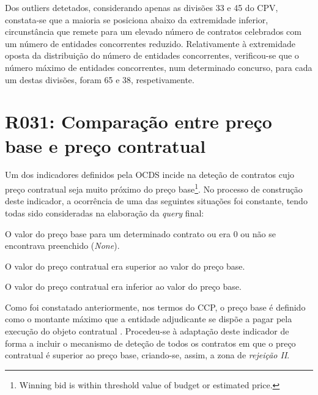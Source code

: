 Dos outliers detetados, considerando apenas as divisões 33 e 45 do CPV, constata-se que a maioria se posiciona abaixo da extremidade inferior, circunstância que remete para um elevado número de contratos celebrados com um número de entidades concorrentes reduzido. Relativamente à extremidade oposta da distribuição do número de entidades concorrentes, verificou-se que o número máximo de entidades concorrentes, num determinado concurso, para cada um destas divisões, foram 65 e 38, respetivamente.



\section{R031: Comparação entre preço base e preço contratual}

Um dos indicadores definidos pela OCDS incide na deteção de contratos cujo preço contratual seja muito próximo do preço base\footnote{Winning bid is within threshold value of budget or estimated price.}. No processo de construção deste indicador, a ocorrência de uma das seguintes situações foi constante, tendo todas sido consideradas na elaboração da \textit{query} final:

\begin{my_enumerate}
	
	\item O valor do preço base para um determinado contrato ou era 0 ou não se encontrava preenchido (\textit{None}). \label{ponto1}
	
	\item O valor do preço contratual era superior ao valor do preço base. \label{ponto2}
	
	\item O valor do preço contratual era inferior ao valor do preço base.
	
\end{my_enumerate}

Como foi constatado anteriormente, nos termos do CCP, o preço base é definido como o montante máximo que a entidade adjudicante se dispõe a pagar pela execução do objeto contratual \cite{precobase}. Procedeu-se à adaptação deste indicador de forma a incluir o mecanismo de deteção de todos os contratos em que o preço contratual é superior ao preço base, criando-se, assim, a zona de \textit{rejeição II}.


